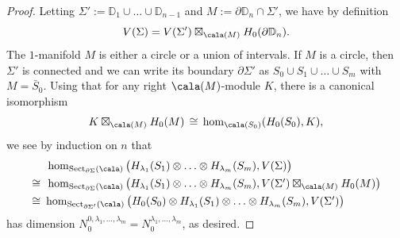 \documentclass[a4paper,10pt,leqno]{amsart}
\newcommand{\ID}{\mathbb{D}}     \newcommand{\cald}{\mathcal{D}}
\theoremstyle{plain}
\theoremstyle{definition}
\theoremstyle{remark}
\DeclareMathOperator{\Rep}{Sect}
\begin{document}
\begin{proof}
Letting $\Sigma':=\ID_1\cup\ldots\cup \ID_{n-1}$ and $M:=\partial\ID_n\cap \Sigma'$, we have by definition
\[
V(\Sigma)=V(\Sigma')\boxtimes_{\cala(M)}H_0(\partial\ID_n).
\]
The $1$-manifold $M$ is either a circle or a union of intervals.
If $M$ is a circle, then $\Sigma'$ is connected and we can write its boundary $\partial\Sigma'$ as $S_0\cup S_1\cup\ldots\cup S_m$ with $M=\bar S_0$.
Using that for any right $\cala(M)$-module $K$, there is a canonical isomorphism
\[
K\boxtimes_{\cala(M)}H_0(M) \,\cong\, \hom_{\cala(S_0)}(H_0(S_0),K),
\]
we see by induction on $n$ that
\[
\begin{split}
&\,\textstyle\hom_{\Rep_{\partial\Sigma}(\cala)}\big(H_{\lambda_1}(S_1)\otimes\ldots\otimes H_{\lambda_m}(S_m),V(\Sigma)\big)\\
\cong\,\,&\,\textstyle\hom_{\Rep_{\partial\Sigma}(\cala)}\big(H_{\lambda_1}(S_1)\otimes\ldots\otimes H_{\lambda_m}(S_m),V(\Sigma')\boxtimes_{\cala(M)}H_0(M)\big)\\
\cong\,\,&\textstyle\hom_{\Rep_{\partial\Sigma'}(\cala)}\big(H_0(S_0)\otimes H_{\lambda_1}(S_1)\otimes\ldots\otimes H_{\lambda_m}(S_m),V(\Sigma')\big)\\
\end{split}
\]
has dimension $N_0^{0,\lambda_1,\ldots,\lambda_m}=N_0^{\lambda_1,\ldots,\lambda_m}$, as desired.


\end{proof}
\end{document}
